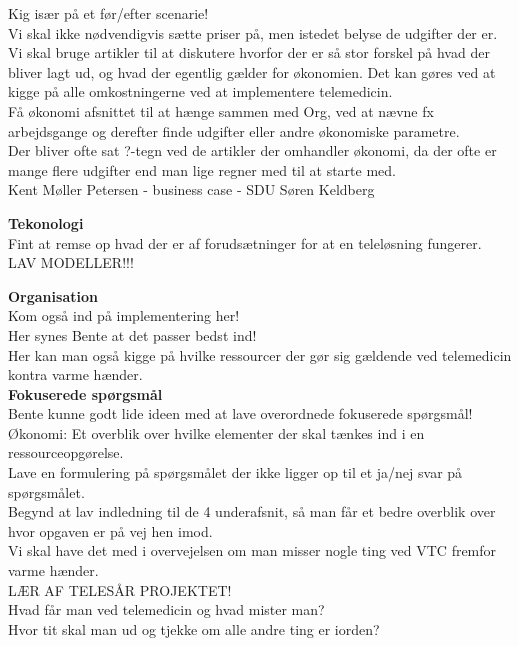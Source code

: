 Kig især på et før/efter scenarie! \\

Vi skal ikke nødvendigvis sætte priser på, men istedet belyse de udgifter der er. \\
Vi skal bruge artikler til at diskutere hvorfor der er så stor forskel på hvad der bliver lagt ud, og hvad der egentlig gælder for økonomien. Det kan gøres ved at kigge på alle omkostningerne ved at implementere telemedicin.\\
Få økonomi afsnittet til at hænge sammen med Org, ved at nævne fx arbejdsgange og derefter finde udgifter eller andre økonomiske parametre. \\
Der bliver ofte sat ?-tegn ved de artikler der omhandler økonomi, da der ofte er mange flere udgifter end man lige regner med til at starte med.\\

Kent Møller Petersen - business case - SDU
Søren Keldberg 


\textbf{Tekonologi} 
\\
Fint at remse op hvad der er af forudsætninger for at en teleløsning fungerer. \\
LAV MODELLER!!! 

\textbf{Organisation} 
\\
Kom også ind på implementering her!\\
Her synes Bente at det passer bedst ind!\\
Her kan man også kigge på hvilke ressourcer der gør sig gældende ved telemedicin kontra varme hænder.\\


\textbf{Fokuserede spørgsmål} 
\\
Bente kunne godt lide ideen med at lave overordnede fokuserede spørgsmål!\\
Økonomi: Et overblik over hvilke elementer der skal tænkes ind i en ressourceopgørelse.\\

Lave en formulering på spørgsmålet der ikke ligger op til et ja/nej svar på spørgsmålet.\\
Begynd at lav indledning til de 4 underafsnit, så man får et bedre overblik over hvor opgaven er på vej hen imod.\\

Vi skal have det med i overvejelsen om man misser nogle ting ved VTC fremfor varme hænder.\\
LÆR AF TELESÅR PROJEKTET! \\
Hvad får man ved telemedicin og hvad mister man?\\
Hvor tit skal man ud og tjekke om alle andre ting er iorden?
